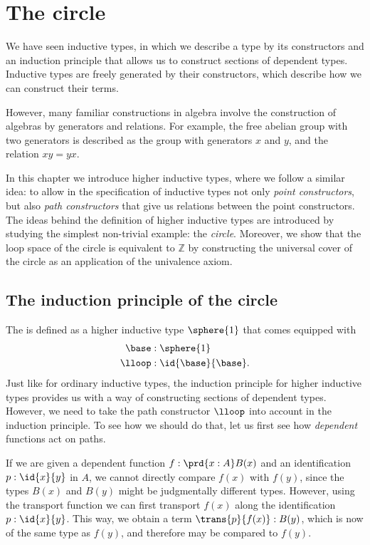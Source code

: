 \chapter{The circle}

We have seen inductive types, in which we describe a type by its constructors and an induction principle that allows us to construct sections of dependent types. Inductive types are freely generated by their constructors, which describe how we can construct their terms. 

However, many familiar constructions in algebra involve the construction of algebras by generators and relations. 
For example, the free abelian group with two generators is described as the group with generators $x$ and $y$, and the relation $xy=yx$. 

In this chapter we introduce higher inductive types, where we follow a similar idea: to allow in the specification of inductive types not only \emph{point constructors}, but also \emph{path constructors} that give us relations between the point constructors. 
The ideas behind the definition of higher inductive types are introduced by studying the simplest non-trivial example: the \emph{circle}.
Moreover, we show that the loop space of the circle is equivalent to $\mathbb{Z}$ by constructing the universal cover of the circle as an application of the univalence axiom. 

\section{The induction principle of the circle}
The  is defined as a higher inductive type $\sphere{1}$ that comes equipped with
\begin{align*}
\base & : \sphere{1} \\
\lloop & : \id{\base}{\base}.
\end{align*}
Just like for ordinary inductive types, the induction principle for higher inductive types provides us with a way of constructing sections of dependent types. However, we need to take the path constructor $\lloop$ into account in the induction principle. To see how we should do that, let us first see how \emph{dependent} functions act on paths.

If we are given a dependent function $f:\prd{x:A}B(x)$ and an identification $p:\id{x}{y}$ in $A$, we cannot directly compare $f(x)$ with $f(y)$, since the types $B(x)$ and $B(y)$ might be judgmentally different types. However, using the transport function we can first transport $f(x)$ along the identification $p:\id{x}{y}$. This way, we obtain a term $\trans{p}{f(x)}:B(y)$, which is now of the same type as $f(y)$, and therefore may be compared to $f(y)$.

